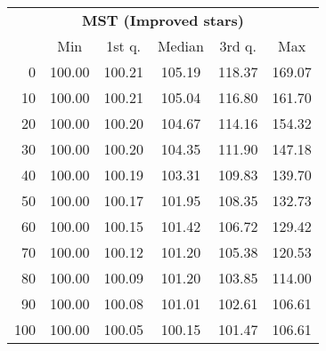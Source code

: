 \begin{tabular}{r|ccccc}
  \multicolumn{6}{c}{{\bf MST (Improved stars)}} \\
  & Min & 1st q. & Median & 3rd q. & Max \\ \hline\hline
  0 & 100.00 & 100.21 & 105.19 & 118.37 & 169.07
\\ 10 & 100.00 & 100.21 & 105.04 & 116.80 & 161.70
\\ 20 & 100.00 & 100.20 & 104.67 & 114.16 & 154.32
\\ 30 & 100.00 & 100.20 & 104.35 & 111.90 & 147.18
\\ 40 & 100.00 & 100.19 & 103.31 & 109.83 & 139.70
\\ 50 & 100.00 & 100.17 & 101.95 & 108.35 & 132.73
\\ 60 & 100.00 & 100.15 & 101.42 & 106.72 & 129.42
\\ 70 & 100.00 & 100.12 & 101.20 & 105.38 & 120.53
\\ 80 & 100.00 & 100.09 & 101.20 & 103.85 & 114.00
\\ 90 & 100.00 & 100.08 & 101.01 & 102.61 & 106.61
\\ 100 & 100.00 & 100.05 & 100.15 & 101.47 & 106.61
\end{tabular}
